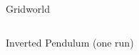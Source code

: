\documentclass[xcolor=x11names,12pt]{beamer}
\begin{document}
\begin{frame}
\begin{columns}
\begin{column}{.48\textwidth}
\begin{block}{Gridworld}
      \end{block}
    \end{column}
  \end{columns}
  \begin{columns}
    \begin{column}{.48\textwidth}
      \begin{block}{Inverted Pendulum (one run)}
        \centering
        \fontsize{11pt}{11pt}\selectfont
      \end{block}
    \end{column}

\end{columns}
\end{frame}
\end{document}
